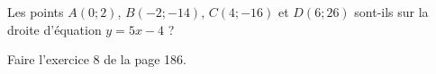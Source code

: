 
\begin{exercice}\label{exosmath-0613}

    Les points \( A(0;2)\), \( B(-2;-14)\), \( C(4;-16)\) et \( D(6;26)\) sont-ils sur la droite d'équation \( y=5x-4\) ?

    Faire l'exercice 8 de la page 186.

\end{exercice}
